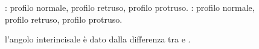\begin{figure}[p!]
 \quad
{}
 \centering
 \caption{ : profilo normale, profilo retruso, profilo protruso.  : profilo normale, profilo retruso, profilo protruso.}
 \label{fig:steiner_sna_snb}
\end{figure}
\begin{figure}[p!]
 \centering
 \caption{l'angolo interincisale  è dato dalla differenza tra  e .}
 \label{fig:steiner_anb}
\end{figure}

